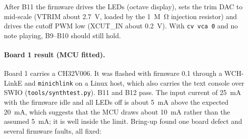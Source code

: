 \documentclass[11pt,a4paper]{article}
\newcommand{\file}[1]{\texttt{#1}}
\begin{document}
\noindent After B11 the firmware drives the LEDs (octave display), sets the trim DAC to mid-scale (VTRIM
about \SI{2.7}{V}, loaded by the \SI{1}{M\ohm} injection resistor) and drives the cutoff PWM low (XCUT\_IN
about \SI{0.2}{V}). With \texttt{cv vca 0} and no note playing, B9--B10 should still hold.

\paragraph{Board 1 result (MCU fitted).} Board 1 carries a CH32V006. It was flashed with firmware 0.1 through a
WCH-LinkE and \file{minichlink} on a Linux host, which also carries the text console over SWIO
(\file{tools/synthtest.py}). B11 and B12 pass. The input current of \SI{25}{mA} with the firmware idle and all
LEDs off is about \SI{5}{mA} above the expected \SI{20}{mA}, which suggests that the MCU draws about
\SI{10}{mA} rather than the assumed \SI{5}{mA}; it is well inside the limit. Bring-up found one board defect
and several firmware faults, all fixed:
\end{document}
